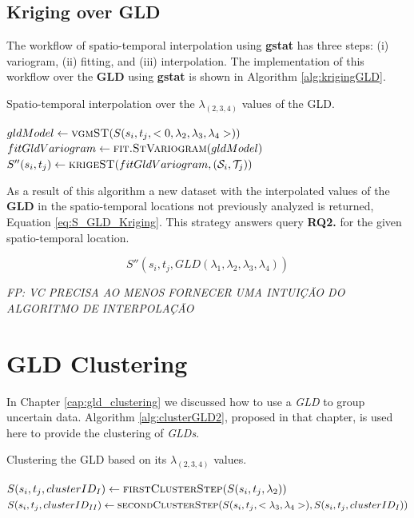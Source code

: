 \subsection{Kriging over GLD}

The workflow of spatio-temporal interpolation using \textbf{gstat} has three steps: (i) variogram, (ii) fitting, and (iii) interpolation. The implementation of this workflow over the \textbf{GLD} using \textbf{gstat} is shown in Algorithm \ref{alg:krigingGLD}.

\begin{algorithm} 
\caption{Spatio-temporal interpolation over the $\lambda_{(2,3,4)}$ values of the GLD.}\label{alg:krigingGLD}
\begin{algorithmic}[1] 
\State $gldModel \gets \Call {vgmST}{S(s_{i},t_{j},<0,\lambda_{2},\lambda_{3},\lambda_{4}>)}$
\State $fitGldVariogram \gets \Call {fit.StVariogram}{gldModel}$
\State $S''(s_{i},t_{j}) \gets \Call {krigeST}{fitGldVariogram, (\mathcal{S}_{i}, \mathcal{T}_{j})}$
\EndFunction 
\end{algorithmic} 
\end{algorithm} 

As a result of this algorithm a new dataset with the interpolated values of the \textbf{GLD} in the spatio-temporal locations not previously analyzed is returned, Equation \ref{eq:S_GLD_Kriging}. This strategy answers query \textbf{RQ2.} for the given spatio-temporal location.

\begin{equation}\label{eq:S_GLD_Kriging}
S''(s_{i},t_{j},GLD(\lambda_{1}, \lambda_{2}, \lambda_{3}, \lambda_{4}))
\end{equation}

\emph{FP: VC PRECISA AO MENOS FORNECER UMA INTUIÇÃO DO ALGORITMO DE INTERPOLAÇÃO}

\section{GLD Clustering}\label{sec:clustering}
In Chapter \ref{cap:gld_clustering} we discussed how to use a \textit{GLD} to group uncertain data. Algorithm \ref{alg:clusterGLD2}, proposed in that chapter, is used here to provide the clustering of \textit{GLDs}.

\begin{algorithm} 
\caption{Clustering the GLD based on its $\lambda_{(2,3,4)}$ values.}\label{alg:clusterGLD2}
\begin{algorithmic}[1] 
\State $S(s_{i},t_{j}, clusterID_{I}) \gets \Call {firstClusterStep}{S(s_{i},t_{j},\lambda_{2})}$
\State $S(s_{i},t_{j}, clusterID_{II}) \gets \Call {secondClusterStep}{S(s_{i},t_{j},<\lambda_{3},\lambda_{4}>), S(s_{i},t_{j}, clusterID_{I})}$
\EndFor
\EndFunction 
\end{algorithmic} 
\end{algorithm} 

